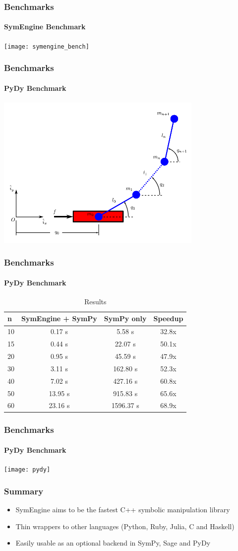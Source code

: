 \documentclass{beamer}
\begin{document}
\begin{frame}
\frametitle{Benchmarks}
\framesubtitle{SymEngine Benchmark}
\texttt{[image: symengine\_bench]}
\end{frame}


\begin{frame}
\frametitle{Benchmarks}
\framesubtitle{PyDy Benchmark}
\includegraphics[width=10cm]{n-pendulum-with-cart}
\end{frame}


\begin{frame}
\frametitle{Benchmarks}
\framesubtitle{PyDy Benchmark}
\begin{table}
\begin{tabular}{l | c | c | c  }
n & SymEngine + SymPy & SymPy only & Speedup\\
\hline \hline
10 & 0.17 s & 5.58 s & 32.8x \\
15 & 0.44 s & 22.07 s & 50.1x \\
20 & 0.95 s & 45.59 s & 47.9x \\
30 & 3.11 s & 162.80 s & 52.3x \\
40 & 7.02 s & 427.16 s & 60.8x \\
50 & 13.95 s & 915.83 s & 65.6x \\
60 & 23.16 s & 1596.37 s & 68.9x
\end{tabular}
\caption{Results}
\end{table}
\end{frame}


\begin{frame}
\frametitle{Benchmarks}
\framesubtitle{PyDy Benchmark}
\texttt{[image: pydy]}
\end{frame}


\begin{frame}
\frametitle{Summary}
\begin{itemize}
 \item SymEngine aims to be the fastest C++ symbolic manipulation library
 \item Thin wrappers to other languages (Python, Ruby, Julia, C and Haskell)
 \item Easily usable as an optional backend in SymPy, Sage and PyDy
\end{itemize}
\end{frame}
\end{document}
